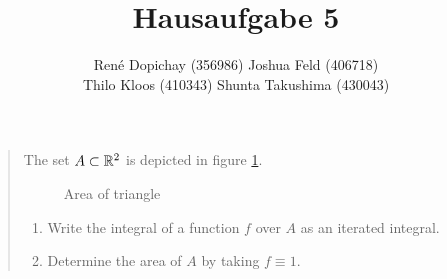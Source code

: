 \documentclass{exercise}
\title{Hausaufgabe 5}
\author{René Dopichay (356986) \quad Joshua Feld (406718)\\Thilo Kloos (410343) \quad Shunta Takushima (430043)}
\begin{document}
	\maketitle


	\section{}

	\begin{quote}
		The set \(A \subset \mathbb{R}^2\) is depicted in figure \ref{fig:1-1}.
		\begin{figure}[h]
			\centering
			\caption{Area of triangle}
			\label{fig:1-1}
		\end{figure}
		\begin{enumerate}
			\item Write the integral of a function \(f\) over \(A\) as an iterated integral.
			\item Determine the area of \(A\) by taking \(f \equiv 1\).
		\end{enumerate}
	\end{quote}
\end{document}
